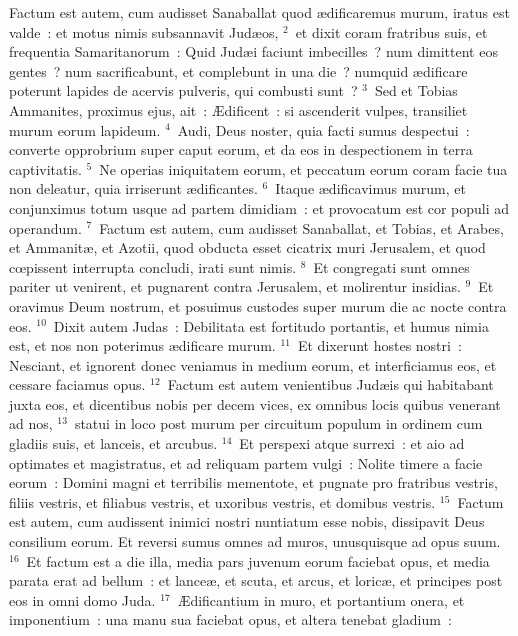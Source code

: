 \lettrine[lines=10,image=true,loversize=0.05,lraise=-0.03]{F}{}actum est autem, cum audisset Sanaballat quod \ae dificaremus murum, iratus est valde~: et motus nimis subsannavit Jud\ae os,
${}^{2}$~et dixit coram fratribus suis, et frequentia Samaritanorum~: Quid Jud\ae i faciunt imbecilles~? num dimittent eos gentes~? num sacrificabunt, et complebunt in una die~? numquid \ae dificare poterunt lapides de acervis pulveris, qui combusti sunt~?
${}^{3}$~Sed et Tobias Ammanites, proximus ejus, ait~: \AE dificent~: si ascenderit vulpes, transiliet murum eorum lapideum.
${}^{4}$~Audi, Deus noster, quia facti sumus despectui~: converte opprobrium super caput eorum, et da eos in despectionem in terra captivitatis.
${}^{5}$~Ne operias iniquitatem eorum, et peccatum eorum coram facie tua non deleatur, quia irriserunt \ae dificantes.
${}^{6}$~Itaque \ae dificavimus murum, et conjunximus totum usque ad partem dimidiam~: et provocatum est cor populi ad operandum.
${}^{7}$~Factum est autem, cum audisset Sanaballat, et Tobias, et Arabes, et Ammanit\ae , et Azotii, quod obducta esset cicatrix muri Jerusalem, et quod cœpissent interrupta concludi, irati sunt nimis.
${}^{8}$~Et congregati sunt omnes pariter ut venirent, et pugnarent contra Jerusalem, et molirentur insidias.
${}^{9}$~Et oravimus Deum nostrum, et posuimus custodes super murum die ac nocte contra eos.
${}^{10}$~Dixit autem Judas~: Debilitata est fortitudo portantis, et humus nimia est, et nos non poterimus \ae dificare murum.
${}^{11}$~Et dixerunt hostes nostri~: Nesciant, et ignorent donec veniamus in medium eorum, et interficiamus eos, et cessare faciamus opus.
${}^{12}$~Factum est autem venientibus Jud\ae is qui habitabant juxta eos, et dicentibus nobis per decem vices, ex omnibus locis quibus venerant ad nos,
${}^{13}$~statui in loco post murum per circuitum populum in ordinem cum gladiis suis, et lanceis, et arcubus.
${}^{14}$~Et perspexi atque surrexi~: et aio ad optimates et magistratus, et ad reliquam partem vulgi~: Nolite timere a facie eorum~: Domini magni et terribilis mementote, et pugnate pro fratribus vestris, filiis vestris, et filiabus vestris, et uxoribus vestris, et domibus vestris.
${}^{15}$~Factum est autem, cum audissent inimici nostri nuntiatum esse nobis, dissipavit Deus consilium eorum. Et reversi sumus omnes ad muros, unusquisque ad opus suum.
${}^{16}$~Et factum est a die illa, media pars juvenum eorum faciebat opus, et media parata erat ad bellum~: et lance\ae , et scuta, et arcus, et loric\ae , et principes post eos in omni domo Juda.
${}^{17}$~\AE dificantium in muro, et portantium onera, et imponentium~: una manu sua faciebat opus, et altera tenebat gladium~:
